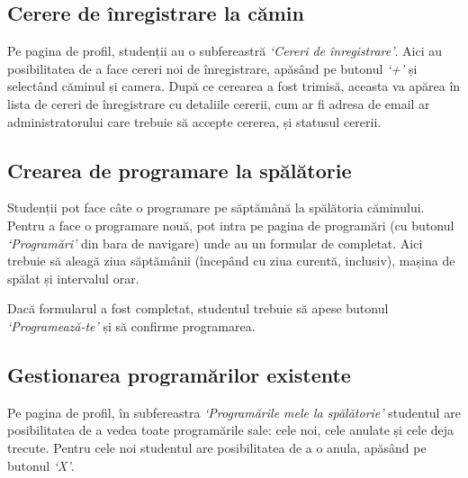 \documentclass[12pt,a4paper]{report}
\theoremstyle{definition}
\theoremstyle{remark}
\begin{document}
\subsection{Cerere de înregistrare la cămin}

\par Pe pagina de profil, studenții au o subfereastră \textit{`Cereri de înregistrare'}. Aici au posibilitatea de a face cereri noi de înregistrare, apăsând pe butonul \textit{`+'} și selectând căminul și camera. După ce cerearea a fost trimisă, aceasta va apărea în lista de cereri de înregistrare cu detaliile cererii, cum ar fi adresa de email ar administratorului care trebuie să accepte cererea, și statusul cererii.


\subsection{Crearea de programare la spălătorie}

\par Studenții pot face câte o programare pe săptămână la spălătoria căminului. Pentru a face o programare nouă, pot intra pe pagina de programări (cu butonul \textit{`Programări'} din bara de navigare) unde au un formular de completat. Aici trebuie să aleagă ziua săptămânii (începând cu ziua curentă, inclusiv), mașina de spălat și intervalul orar.

\par Dacă formularul a fost completat, studentul trebuie să apese butonul \textit{`Programează-te'} și să confirme programarea.


\subsection{Gestionarea programărilor existente}

\par Pe pagina de profil, în subfereastra \textit{`Programările mele la spălătorie'} studentul are posibilitatea de a vedea toate programările sale: cele noi, cele anulate și cele deja trecute. Pentru cele noi studentul are posibilitatea de a o anula, apăsând pe butonul \textit{`X'}.

\end{document}
